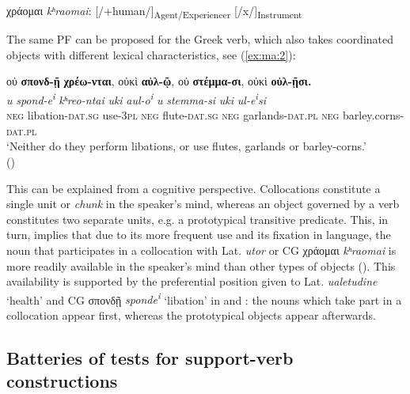 \documentclass[output=paper,colorlinks,citecolor=brown]{langscibook}
\begin{document}
\begin{center}
  χράομαι \emph{kʰraomai}:
  {[}/+human/{]}\textsubscript{Agent/Experiencer} {[}/x/{]}\textsubscript{Instrument}
\end{center}

The same PF can be proposed for the Greek verb, which also takes
coordinated objects with different lexical characteristics, see (\ref{ex:ma:2}):


\ea\label{ex:ma:2}

\glll οὐ \textbf{σπονδ-ῇ} \textbf{χρέω-νται}, οὐκὶ \textbf{αὐλ-ῷ}, οὐ \textbf{στέμμα-σι}, οὐκὶ \textbf{οὐλ-ῇσι.}\\
 \textit{u} \textit{spond-e\textsuperscript{i}} \textit{kʰreo-ntai} \textit{uki} \textit{aul-o\textsuperscript{i}} \textit{u} \textit{stemma-si} \textit{uki} \textit{ul-e\textsuperscript{i}si}\\
\textsc{neg} libation-\textsc{dat.sg} use-3\textsc{pl} \textsc{neg} flute-\textsc{dat.sg} \textsc{neg} garlands-\textsc{dat.pl} \textsc{neg} barley.corns-\textsc{dat.pl}\\
\glt `Neither do they perform libations, or use flutes, garlands or barley-corns.' \\
\hspace*{\fill}()

\z

This can be explained from a cognitive perspective. Collocations constitute a single unit
or \emph{chunk} in the speaker's mind, whereas an object governed by a verb constitutes
two separate units, e.g. a prototypical transitive predicate. This, in turn,
implies that due to its more frequent use and its fixation in language, the noun that
participates in a collocation with Lat. \emph{utor} or CG χράομαι
\emph{kʰraomai} is more readily available in the speaker's mind than
other types of objects (\cite[271]{bybee_frequency_2001}). This availability is supported
by the preferential position given to Lat. \emph{ualetudine} `health' and CG σπονδῇ
\emph{sponde\textsuperscript{i}} `libation' in  and : the nouns which take part in a
collocation appear first, whereas the prototypical objects appear afterwards.

\subsection{Batteries of tests for support-verb constructions}\label{sec:ma:4:2}
\end{document}
